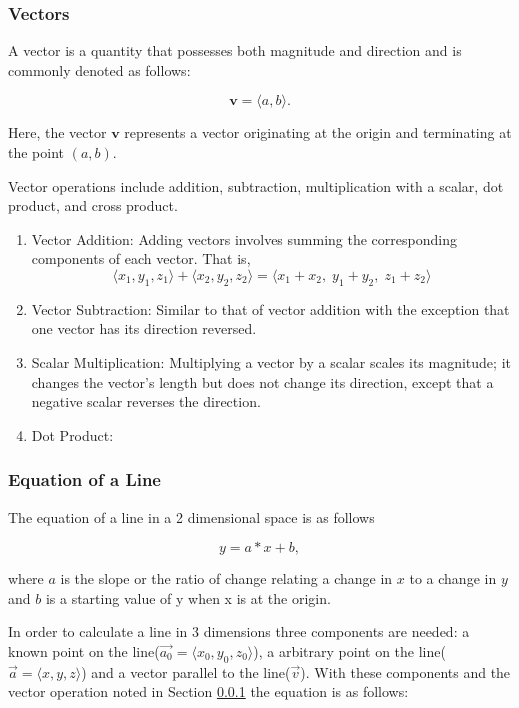 \subsubsection{Vectors}
\label{sec:vector}
A vector is a quantity that possesses both magnitude and direction and is commonly denoted as follows:

\begin{equation}
    \mathbf{v} = \langle a, b \rangle.
\end{equation}

Here, the vector $\mathbf{v}$ represents a vector originating at the origin and terminating at the point $(a,b)$.

Vector operations include addition, subtraction, multiplication with a scalar, dot product, and cross product.

\begin{enumerate}
    \item Vector Addition: Adding vectors involves summing the corresponding components of each vector. That is,
        \begin{equation}
            \langle x_1, y_1, z_1 \rangle + \langle x_2, y_2, z_2 \rangle
            = \langle x_1 + x_2, \; y_1 + y_2, \; z_1 + z_2 \rangle
        \end{equation}
    \item Vector Subtraction: Similar to that of vector addition with the exception that one vector has its direction reversed. 
    \item Scalar Multiplication: Multiplying a vector by a scalar scales its magnitude; it changes the vector's length but does not change its direction, except that a negative scalar reverses the direction.
    \item Dot Product:  
\end{enumerate}


\subsubsection{Equation of a Line}
The equation of a line in a 2 dimensional space is as follows 

\begin{equation}
    y = a*x+b,
\end{equation}

where $a$ is the slope or the ratio of change relating a change in $x$ to a change in $y$ and $b$ is a starting value of y when x is at the origin. 

In order to calculate a line in 3 dimensions three components are needed: a known point on the line($\vec{a_0} = \langle x_0, y_0, z_0\rangle$), a arbitrary point on the line($\vec{a} = \langle x, y, z\rangle$) and a vector parallel to the line($\vec{v}$). With these components and the vector operation noted in Section \ref{sec:vector} the equation is as follows: 

